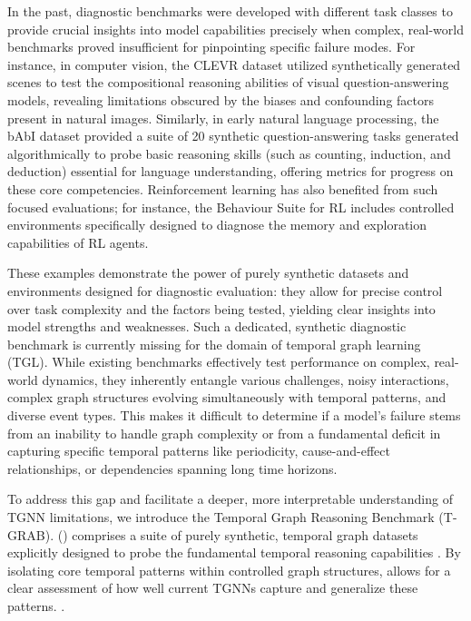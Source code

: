 In the past, diagnostic benchmarks were developed with different task classes to provide crucial insights into model capabilities precisely when complex, real-world benchmarks proved insufficient for pinpointing specific failure modes. For instance, in computer vision, the CLEVR dataset \citep{clevr} utilized synthetically generated scenes to test the compositional reasoning abilities of visual question-answering models, revealing limitations obscured by the biases and confounding factors present in natural images. Similarly, in early natural language processing, the bAbI dataset \citep{babi} provided a suite of 20 synthetic question-answering tasks generated algorithmically to probe basic reasoning skills (such as counting, induction, and deduction) essential for language understanding, offering metrics for progress on these core competencies. Reinforcement learning has also benefited from such focused evaluations; for instance, the Behaviour Suite for RL \citep{bsuite} includes controlled environments specifically designed to diagnose the memory and exploration capabilities of RL agents. 

 These examples demonstrate the power of purely synthetic datasets and environments designed for diagnostic evaluation: they allow for precise control over task complexity and the factors being tested, yielding clear insights into model strengths and weaknesses. Such a dedicated, synthetic diagnostic benchmark is currently missing for the domain of temporal graph learning (TGL). While existing benchmarks effectively test performance on complex, real-world dynamics, they inherently entangle various challenges, noisy interactions, complex graph structures evolving simultaneously with temporal patterns, and diverse event types. This makes it difficult to determine if a model's failure stems from an inability to handle graph complexity or from a fundamental deficit in capturing specific temporal patterns like periodicity, cause-and-effect relationships, or dependencies spanning long time horizons.

 To address this gap and facilitate a deeper, more interpretable understanding of TGNN limitations, we introduce the Temporal Graph Reasoning Benchmark (T-GRAB). \benchmarkname () comprises a suite of purely synthetic,  temporal graph datasets explicitly designed to probe the fundamental temporal reasoning capabilities . By isolating core temporal patterns within controlled graph structures, \benchmarkname allows for a clear assessment of how well current TGNNs capture and generalize these patterns. 
.


